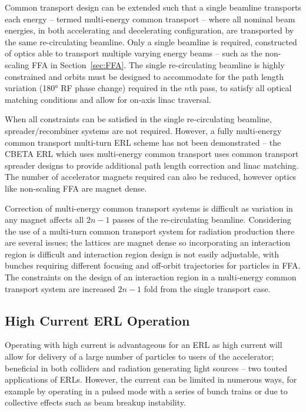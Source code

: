 \documentclass[../main.tex]{subfiles}
\begin{document}
Common transport design can be extended such that a single beamline transports each energy -- termed multi-energy common transport -- where all nominal beam energies, in both accelerating and decelerating configuration, are transported by the same re-circulating beamline. Only a single beamline is required, constructed of optics able to transport multiple varying energy beams -- such as the non-scaling FFA in Section~\ref{sec:FFA}. The single re-circulating beamline is highly constrained and orbits must be designed to accommodate for the path length variation (180\si{\degree} RF phase change) required in the $n$th pass, to satisfy all optical matching conditions and allow for on-axis linac traversal. 

When all constraints can be satisfied in the single re-circulating beamline, spreader/recombiner systems are not required. However, a fully multi-energy common transport multi-turn ERL scheme has not been demonstrated -- the CBETA ERL \cite{hoffstaetter2017cbeta,bartnik2020cbeta} which uses multi-energy common transport uses common transport spreader designs to provide additional path length correction and linac matching. The number of accelerator magnets required can also be reduced, however optics like non-scaling FFA are magnet dense.

Correction of multi-energy common transport systems is difficult as variation in any magnet affects all $2n-1$ passes of the re-circulating beamline. Considering the use of a multi-turn common transport system for radiation production there are several issues; the lattices are magnet dense so incorporating an interaction region is difficult and interaction region design is not easily adjustable, with bunches requiring different focusing and off-orbit trajectories for particles in FFA. The constraints on the design of an interaction region in a multi-energy common transport system are increased $2n-1$ fold from the single transport case.   

\subsection{High Current ERL Operation}
\label{sec:high_current_ERL}

Operating with high current is advantageous for an ERL as high current will allow for delivery of a large number of particles to users of the accelerator; beneficial in both colliders and radiation generating light sources -- two touted applications of ERLs. However, the current can be limited in numerous ways, for example by operating in a pulsed mode with a series of bunch trains or due to collective effects such as beam breakup instability. 
\end{document}
